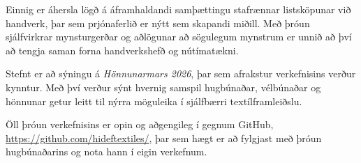 \documentclass[a4paper,12pt]{article}
\begin{document}
Einnig er áhersla lögð á áframhaldandi samþættingu stafrænnar listsköpunar við handverk, 
þar sem prjónaferlið er nýtt sem skapandi miðill. Með þróun sjálfvirkrar mynsturgerðar og aðlögunar að sögulegum mynstrum 
er unnið að því að tengja saman forna handverkshefð og nútímatækni.

Stefnt er að sýningu á \emph{Hönnunarmars 2026}, þar sem afrakstur verkefnisins verður kynntur. Með því verður sýnt hvernig
samspil hugbúnaðar, vélbúnaðar og hönnunar getur leitt til nýrra möguleika í sjálfbærri textílframleiðslu.

Öll þróun verkefnisins er opin og aðgengileg í gegnum GitHub, \url{https://github.com/hideftextiles/}, þar sem hægt er að fylgjast með þróun hugbúnaðarins og nota hann í eigin verkefnum. 

\printbibliography
\end{document}

